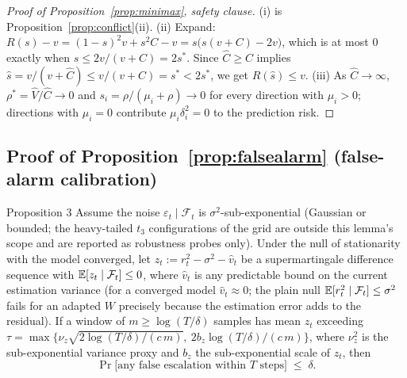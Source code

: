 \begin{proof}[Proof of Proposition~\ref{prop:minimax}, safety clause]
(i) is Proposition~\ref{prop:conflict}(ii).
(ii) Expand: $R(s) - v = (1-s)^2 v + s^2 C - v = s\bigl(s(v + C) - 2v\bigr)$, which is at most $0$ exactly when $s \le 2v/(v+C) = 2s^*$.
Since $\widehat C \ge C$ implies $\widehat s = v/(v + \widehat C) \le v/(v + C) = s^* < 2s^*$, we get $R(\widehat s) \le v$.
(iii) As $\widehat C \to \infty$, $\rho^* = \widehat V/\widehat C \to 0$ and $s_i = \rho/(\mu_i + \rho) \to 0$ for every direction with $\mu_i > 0$; directions with $\mu_i = 0$ contribute $\mu_i \delta_i^2 = 0$ to the prediction risk.
\end{proof}

\subsection{Proof of Proposition~\ref{prop:falsealarm} (false-alarm calibration)}
\label{app:proof-falseesc}

\begin{restated}{Proposition 3}
Assume the noise $\varepsilon_t \mid \mathcal F_t$ is $\sigma^2$-sub-exponential (Gaussian or bounded; the heavy-tailed $t_3$ configurations of the grid are outside this lemma's scope and are reported as robustness probes only).
Under the null of stationarity with the model converged, let $z_t := r_t^2 - \sigma^2 - \widehat v_t$ be a supermartingale difference sequence with $\mathbb{E}[z_t \mid \mathcal F_t] \le 0$, where $\widehat v_t$ is any predictable bound on the current estimation variance (for a converged model $\widehat v_t \approx 0$; the plain null $\mathbb{E}[r_t^2 \mid \mathcal F_t] \le \sigma^2$ fails for an adapted $W$ precisely because the estimation error adds to the residual).
If a window of $m \ge \log(T/\delta)$ samples has mean $z_t$ exceeding $\tau = \max\bigl\{\nu_z\sqrt{2\log(T/\delta)/(c\,m)},\ 2 b_z \log(T/\delta)/(c\,m)\bigr\}$, where $\nu_z^2$ is the sub-exponential variance proxy and $b_z$ the sub-exponential scale of $z_t$, then
\[
  \Pr\bigl[\text{any false escalation within } T \text{ steps}\bigr] \;\le\; \delta .
\]
\end{restated}

